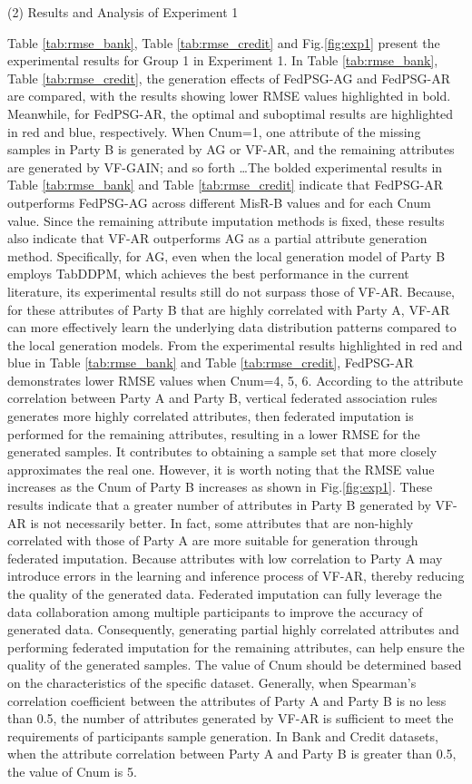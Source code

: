\documentclass[final,1p,times]{elsarticle}
\begin{document}
(2) Results and Analysis of Experiment 1

Table \ref{tab:rmse_bank}, Table \ref{tab:rmse_credit} and Fig.\ref{fig:exp1} present the experimental results for Group 1 in Experiment 1. In Table \ref{tab:rmse_bank}, Table \ref{tab:rmse_credit}, the generation effects of FedPSG-AG and FedPSG-AR are compared, with the results showing lower RMSE values highlighted in bold. Meanwhile, for FedPSG-AR, the optimal and suboptimal results are highlighted in red and blue, respectively. When Cnum=1, one attribute of the missing samples in Party B is generated by AG or VF-AR, and the remaining attributes are generated by VF-GAIN; and so forth \dots The bolded experimental results in Table \ref{tab:rmse_bank} and Table \ref{tab:rmse_credit} indicate that FedPSG-AR outperforms FedPSG-AG across different MisR-B values and for each Cnum value. Since the remaining attribute imputation methods is fixed, these results also indicate that VF-AR outperforms AG as a partial attribute generation method. Specifically, for AG, even when the local generation model of Party B employs TabDDPM, which achieves the best performance in the current literature, its experimental results still do not surpass those of VF-AR. Because, for these attributes of Party B that are highly correlated with Party A, VF-AR can more effectively learn the underlying data distribution patterns compared to the local generation models. From the experimental results highlighted in red and blue in Table \ref{tab:rmse_bank} and Table \ref{tab:rmse_credit}, FedPSG-AR demonstrates lower RMSE values when Cnum=4, 5, 6. According to the attribute correlation between Party A and Party B, vertical federated association rules generates more highly correlated attributes, then federated imputation is performed for the remaining attributes, resulting in a lower RMSE for the generated samples. It contributes to obtaining a sample set that more closely approximates the real one. However, it is worth noting that the RMSE value increases as the Cnum of Party B increases as shown in Fig.\ref{fig:exp1}. These results indicate that a greater number of attributes in Party B generated by VF-AR is not necessarily better. In fact, some attributes that are non-highly correlated with those of Party A are more suitable for generation through federated imputation. Because attributes with low correlation to Party A may introduce errors in the learning and inference process of VF-AR, thereby reducing the quality of the generated data. Federated imputation can fully leverage the data collaboration among multiple participants to improve the accuracy of generated data. Consequently, generating partial highly correlated attributes and performing federated imputation for the remaining attributes, can help ensure the quality of the generated samples. The value of Cnum should be determined based on the characteristics of the specific dataset. Generally, when Spearman's correlation coefficient between the attributes of Party A and Party B is no less than 0.5, the number of attributes generated by VF-AR is sufficient to meet the requirements of participants sample generation. In Bank and Credit datasets, when the attribute correlation between Party A and Party B is greater than 0.5, the value of Cnum is 5.
\end{document}
